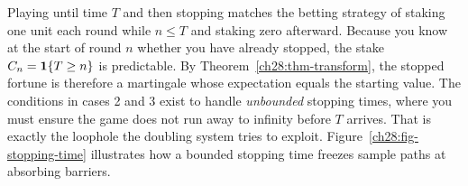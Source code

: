 \begin{intuitionbox}
Playing until time
$T$ and then stopping matches the betting strategy of staking one unit each round while
$n \le T$ and staking zero afterward. Because you know at the start of round $n$ whether you
have already stopped, the stake $C_n = \mathbf{1}\{T \ge n\}$ is predictable. By
Theorem~\ref{ch28:thm-transform}, the stopped fortune is therefore a martingale whose
expectation equals the starting value. The conditions in cases 2 and 3 exist
to handle \emph{unbounded} stopping times, where you must ensure the game does not run away to
infinity before $T$ arrives. That is exactly the loophole the doubling system tries to exploit.
Figure~\ref{ch28:fig-stopping-time} illustrates how a bounded stopping time freezes sample paths at absorbing barriers.
\end{intuitionbox}

